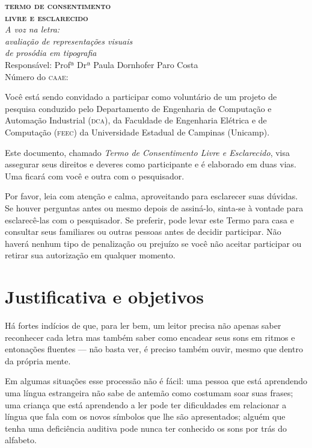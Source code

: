 \documentclass[a4paper,11pt,titlepage,singlespacing]{article}
\begin{document}
	\begin{center}
		\textbf{\Large{\textsc{termo de consentimento \\ livre e esclarecido}}}\\
        \vspace{5pt}
        {\Large\textit{A voz na letra: \\ avaliação de representações visuais \\ de prosódia em tipografia \\ }}
        \vspace{10pt}
        Responsável: Profª Drª Paula Dornhofer Paro Costa\\
        Número do \textsc{caae}: \\
        \vspace{15pt}
	\end{center}

\noindent Você está sendo convidado a participar como voluntário de um projeto de pesquisa conduzido pelo Departamento de Engenharia de Computação e Automação Industrial (\textsc{dca}), da Faculdade de Engenharia Elétrica e de Computação (\textsc{feec}) da Universidade Estadual de Campinas (Unicamp).

Este documento, chamado \textit{Termo de Consentimento Livre e Esclarecido}, visa assegurar seus direitos e deveres como participante e é elaborado em duas vias. Uma ficará com você e outra com o pesquisador.

Por favor, leia com atenção e calma, aproveitando para esclarecer suas dúvidas. Se houver perguntas antes ou mesmo depois de assiná-lo, sinta-se à vontade para esclarecê-las com o pesquisador. Se preferir, pode levar este Termo para casa e consultar seus familiares ou outras pessoas antes de decidir participar. Não haverá nenhum tipo de penalização ou prejuízo se você não aceitar participar ou retirar sua autorização em qualquer momento.


\section*{Justificativa e objetivos}

\noindent Há fortes indícios de que, para ler bem, um leitor precisa não apenas saber reconhecer cada letra mas também saber como encadear seus sons em ritmos e entonações fluentes — não basta ver, é preciso também ouvir, mesmo que dentro da própria mente. 

Em algumas situações esse processão não é fácil: uma pessoa que está aprendendo uma língua estrangeira não sabe de antemão como costumam soar suas frases; uma criança que está aprendendo a ler pode ter dificuldades em relacionar a língua que fala com os novos símbolos que lhe são apresentados; alguém que tenha uma deficiência auditiva pode nunca ter conhecido os sons por trás do alfabeto.
\end{document}
